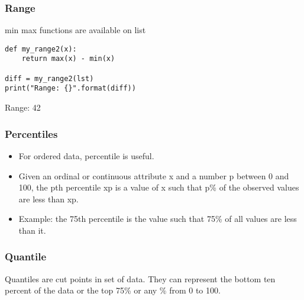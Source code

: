\begin{frame}[fragile]\frametitle{Range}
min max functions are available on list
\begin{lstlisting}
def my_range2(x):
	return max(x) - min(x)

diff = my_range2(lst)
print("Range: {}".format(diff))	
\end{lstlisting}
Range: 42
\end{frame}










\begin{frame}[fragile]\frametitle{Percentiles}	
\begin{itemize}
\item For ordered data, percentile is useful.
\item Given an ordinal or continuous attribute x and a number p between 0 and 100, the pth percentile xp is a value of x such that p\% of the observed values are less than xp.
\item Example: the 75th percentile is the value such that 75\% of all values are less than it.
\end{itemize}

\end{frame}


\begin{frame}[fragile]\frametitle{Quantile}	
Quantiles are cut points in set of data. They can represent the bottom
ten percent of the data or the top 75\% or any \% from 0 to 100.
\end{frame}


